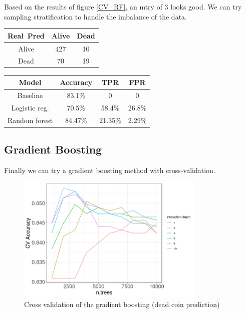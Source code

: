 \documentclass[11pt, english, letterpaper]{article}
\begin{document}
Based on the results of figure \ref{CV_RF}, an mtry of 3 looks good. We can try sampling stratification to handle the imbalance of the data.

\begin{center}
    \begin{tabular}{c|cc}
    Real\ Pred    & Alive & Dead \\
          \hline
    Alive & 427  & 10  \\
    Dead  & 70   & 19  
    \end{tabular} \quad \quad
    \begin{tabular}{c|ccc}
    Model & Accuracy & TPR & FPR \\
          \hline
    Baseline  & 83.1\%   & 0 & 0\\
    Logistic reg. & 70.5\%  & 58.4\% & 26.8\%\\
    Random forest & 84.47\% & 21.35\% & 2.29\%
    \end{tabular}
\end{center}

\subsection{Gradient Boosting}

Finally we can try a gradient boosting method with cross-validation.

\begin{figure}[!h]
    \centering
    \includegraphics[width=0.8\textwidth]{CV_acc_boosting.png}
    \caption{Cross validation of the gradient boosting (dead coin prediction)}
    \label{CV_boosting}
\end{figure}
\end{document}
